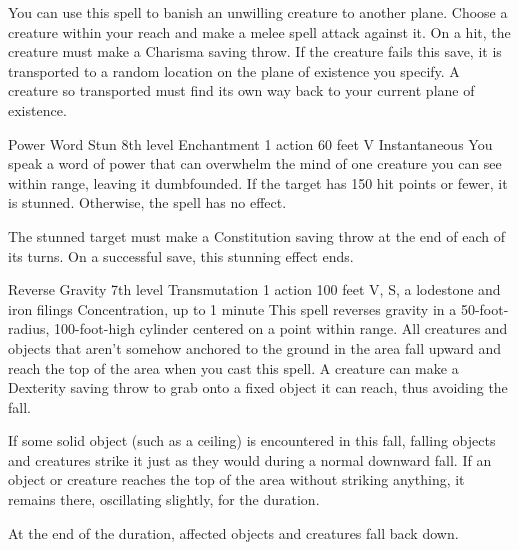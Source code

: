 \documentclass[10pt,a4paper,twoside,bg=print,twocolumn,openany,nodeprecatedcode]{dndbook}
\begin{document}
You can use this spell to banish an unwilling creature to another plane. Choose a creature within your reach and make a melee spell attack against it. On a hit, the creature must make a Charisma saving throw. If the creature fails this save, it is transported to a random location on the plane of existence you specify. A creature so transported must find its own way back to your current plane of existence.



\DndSpellHeader%
{Power Word Stun}
{8th level Enchantment}
{1 action}
{60 feet}
{V}
{Instantaneous}
You speak a word of power that can overwhelm the mind of one creature you can see within range, leaving it dumbfounded. If the target has 150 hit points or fewer, it is stunned. Otherwise, the spell has no effect.

The stunned target must make a Constitution saving throw at the end of each of its turns. On a successful save, this stunning effect ends.



\DndSpellHeader%
{Reverse Gravity}
{7th level Transmutation}
{1 action}
{100 feet}
{V, S, a lodestone and iron filings}
{Concentration, up to 1 minute}
This spell reverses gravity in a 50-foot-radius, 100-foot-high cylinder centered on a point within range. All creatures and objects that aren't somehow anchored to the ground in the area fall upward and reach the top of the area when you cast this spell. A creature can make a Dexterity saving throw to grab onto a fixed object it can reach, thus avoiding the fall.

If some solid object (such as a ceiling) is encountered in this fall, falling objects and creatures strike it just as they would during a normal downward fall. If an object or creature reaches the top of the area without striking anything, it remains there, oscillating slightly, for the duration.

At the end of the duration, affected objects and creatures fall back down.
\end{document}
